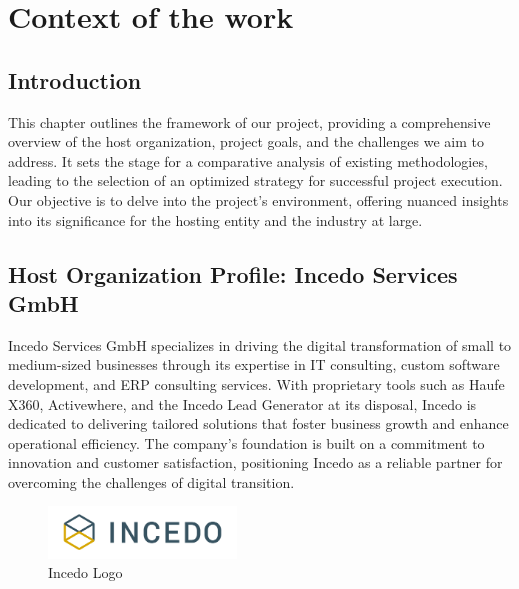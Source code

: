 \chapter{Context of the work}
\minitoc
\newpage

\setcounter{secnumdepth}{0} %
\section{Introduction}
This chapter outlines the framework of our project, providing a comprehensive overview of the host organization, project goals, and the challenges we aim to address. It sets the stage for a comparative analysis of existing methodologies, leading to the selection of an optimized strategy for successful project execution. Our objective is to delve into the project’s environment, offering nuanced insights into its significance for the hosting entity and the industry at large.

\setcounter{secnumdepth}{2} %
\section{Host Organization Profile: Incedo Services GmbH}
Incedo Services GmbH specializes in driving the digital transformation of small to medium-sized businesses through its expertise in IT consulting, custom software development, and ERP consulting services. With proprietary tools such as Haufe X360, Activewhere, and the Incedo Lead Generator at its disposal, Incedo is dedicated to delivering tailored solutions that foster business growth and enhance operational efficiency. The company’s foundation is built on a commitment to innovation and customer satisfaction, positioning Incedo as a reliable partner for overcoming the challenges of digital transition.


\begin{figure}[h]
    \centering
    \includegraphics[width=5cm]{src/assets/chapters/incedo-logo.png} 
    \caption{Incedo Logo}
    \label{fig:incedo-logo}
  \end{figure}


